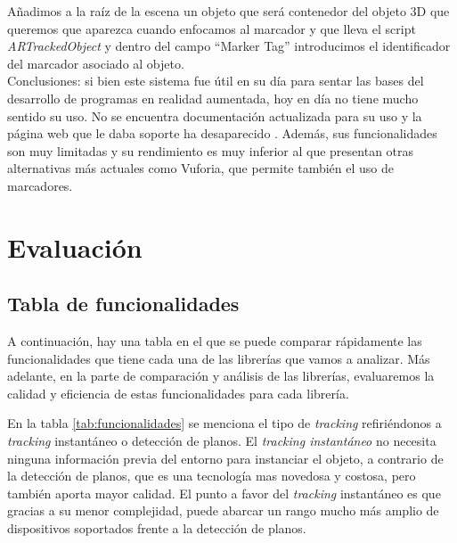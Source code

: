 Añadimos a la raíz de la escena un objeto que será contenedor del objeto 3D que queremos que aparezca cuando enfocamos al marcador y que lleva el script \textit{ARTrackedObject} y dentro del campo ``Marker Tag'' introducimos el identificador del marcador asociado al objeto.\\

Conclusiones: si bien este sistema fue útil en su día para sentar las bases del desarrollo de programas en realidad aumentada, hoy en día no tiene mucho sentido su uso. No se encuentra  documentación actualizada para su uso y la página web que le daba soporte ha desaparecido \cite{artoolkit_web}. Además, sus funcionalidades son muy limitadas y su rendimiento es muy inferior al que presentan otras alternativas más actuales como Vuforia, que permite también el uso de marcadores.\\

\clearpage
\section{Evaluación}
\subsection{Tabla de funcionalidades}
A continuación, hay una tabla en el que se puede comparar rápidamente las funcionalidades que tiene cada una de las librerías que vamos a analizar. Más adelante, en la parte de comparación y análisis de las librerías, evaluaremos la calidad y eficiencia de estas funcionalidades para cada librería.

En la tabla \ref{tab:funcionalidades} se menciona el tipo de \textit{tracking} refiriéndonos a \textit{tracking} instantáneo o detección de planos. El \textit{tracking instantáneo} no necesita ninguna información previa del entorno para instanciar el objeto, a contrario de la detección de planos, que es una tecnología mas novedosa y costosa, pero también aporta mayor calidad. El punto a favor del \textit{tracking} instantáneo es que gracias a su menor complejidad, puede abarcar un rango mucho más amplio de dispositivos soportados frente a la detección de planos.

